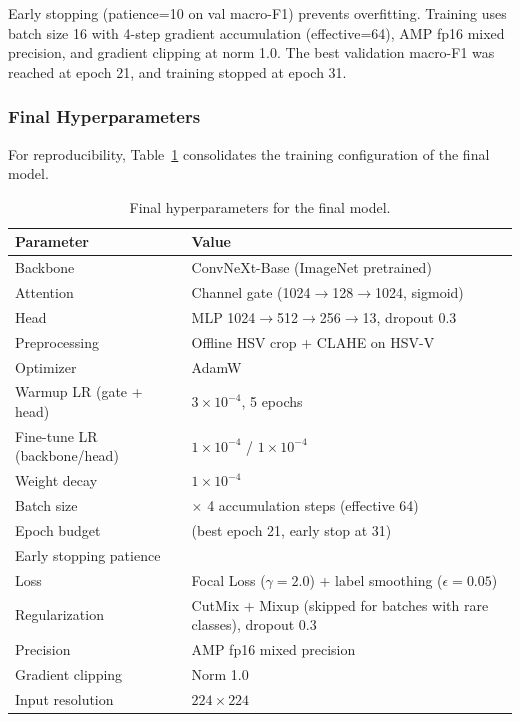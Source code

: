 \documentclass[twocolumn,a4paper]{article}
\begin{document}
Early stopping (patience=10 on val macro-F1) prevents overfitting. Training uses batch size 16 with 4-step gradient accumulation (effective=64), AMP fp16 mixed precision, and gradient clipping at norm 1.0. The best validation macro-F1 was reached at epoch 21, and training stopped at epoch 31.

\subsubsection{Final Hyperparameters}

For reproducibility, Table~\ref{tab:hparams} consolidates the training configuration of the final model.

\begin{table}[htbp]
\centering
\caption{Final hyperparameters for the final model.}
\label{tab:hparams}
\footnotesize
\setlength{\tabcolsep}{4pt}
\begin{tabular}{@{}>{\raggedright\arraybackslash}p{2.5cm}>{\raggedright\arraybackslash}p{5.5cm}@{}}
\toprule
\textbf{Parameter} & \textbf{Value} \\
\midrule
Backbone & ConvNeXt-Base (ImageNet pretrained) \\
Attention & Channel gate (1024$\to$128$\to$1024, sigmoid) \\
Head & MLP 1024$\to$512$\to$256$\to$13, dropout 0.3 \\
Preprocessing & Offline HSV crop + CLAHE on HSV-V \\
Optimizer & AdamW \\
Warmup LR (gate + head) & $3\times10^{-4}$, 5 epochs \\
Fine-tune LR (backbone/head) & $1\times10^{-4}$ / $1\times10^{-4}$ \\
Weight decay & $1\times10^{-4}$ \\
Batch size & 16 $\times$ 4 accumulation steps (effective 64) \\
Epoch budget & 60 (best epoch 21, early stop at 31) \\
Early stopping patience & 10 \\
Loss & Focal Loss ($\gamma=2.0$) + label smoothing ($\epsilon=0.05$) \\
Regularization & CutMix + Mixup (skipped for batches with rare classes), dropout 0.3 \\
Precision & AMP fp16 mixed precision \\
Gradient clipping & Norm 1.0 \\
Input resolution & $224\times224$ \\
\bottomrule
\end{tabular}
\end{table}
\end{document}
